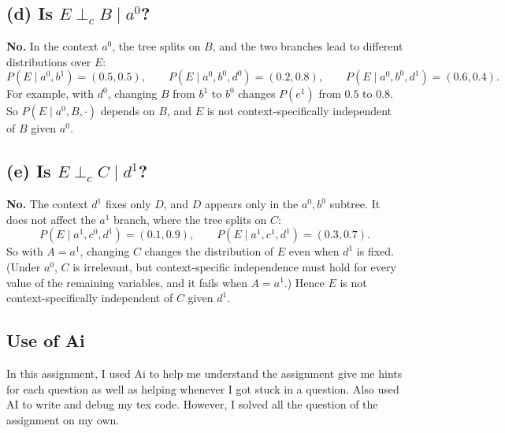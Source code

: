 \documentclass[11pt]{article}
\newcommand{\indep}{\perp}
\begin{document}
\subsection*{(d) Is $E \indep_c B \mid a^0$?}
\textbf{No.} In the context $a^0$, the tree splits on $B$, and the two
branches lead to different distributions over $E$:
\[
  P(E \mid a^0, b^1) = (0.5, 0.5),
  \qquad
  P(E \mid a^0, b^0, d^0) = (0.2, 0.8),
  \qquad
  P(E \mid a^0, b^0, d^1) = (0.6, 0.4).
\]
For example, with $d^0$, changing $B$ from $b^1$ to $b^0$ changes
$P(e^1)$ from $0.5$ to $0.8$. So $P(E \mid a^0, B, \cdot)$ depends on $B$,
and $E$ is not context-specifically independent of $B$ given $a^0$.

\subsection*{(e) Is $E \indep_c C \mid d^1$?}
\textbf{No.} The context $d^1$ fixes only $D$, and $D$ appears only in the
$a^0, b^0$ subtree. It does not affect the $a^1$ branch, where the tree
splits on $C$:
\[
  P(E \mid a^1, c^0, d^1) = (0.1, 0.9),
  \qquad
  P(E \mid a^1, c^1, d^1) = (0.3, 0.7).
\]
So with $A = a^1$, changing $C$ changes the distribution of $E$ even when
$d^1$ is fixed. (Under $a^0$, $C$ is irrelevant, but context-specific
independence must hold for every value of the remaining variables, and it
fails when $A = a^1$.) Hence $E$ is not context-specifically independent of
$C$ given $d^1$.


\subsection*{Use of Ai}
In this assignment, I used Ai to help me understand the assignment give me hints for each question as well as helping whenever I got stuck in a question. Also used AI to write and debug my tex code. However, I solved all the question of the assignment on my own.
\end{document}

